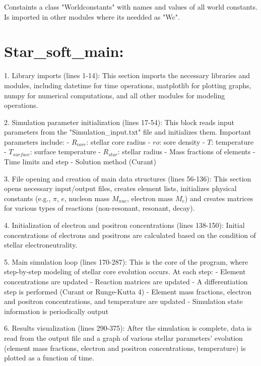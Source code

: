 \documentclass[a4paper,12pt]{article}
\begin{document}
\vspace{1em}

Constaints a class "Worldconstants" with names and values of all world constants. Is imported in other modules where its needded as "Wc".

\section{Star\_soft\_main:}

\vspace{1em}

1. Library imports (lines 1-14):
   This section imports the necessary libraries and modules, including datetime for time operations, matplotlib for plotting graphs, numpy for numerical computations, and all other modules for modeling operations.

2. Simulation parameter initialization (lines 17-54):
   This block reads input parameters from the "Simulation\_input.txt" file and initializes them. Important parameters include:
   - $R_{core}$: stellar core radius
   - $ro$: sore density
   - $T$: temperature
   - $T_{surface}$: surface temperature
   - $R_{star}$: stellar radius
   - Mass fractions of elements
   - Time limits and step
   - Solution method (Curant)

3. File opening and creation of main data structures (lines 56-136):
   This section opens necessary input/output files, creates element lists, initializes physical constants (e.g., $\pi$, $e$, nucleon mass $M_{nuc}$, electron mass $M_e$) and creates matrices for various types of reactions (non-resonant, resonant, decay).

4. Initialization of electron and positron concentrations (lines 138-150):
   Initial concentrations of electrons and positrons are calculated based on the condition of stellar electroneutrality.

5. Main simulation loop (lines 170-287):
   This is the core of the program, where step-by-step modeling of stellar core evolution occurs. At each step:
   - Element concentrations are updated
   - Reaction matrices are updated
   - A differentiation step is performed (Curant or Runge-Kutta 4)
   - Element mass fractions, electron and positron concentrations, and temperature are updated
   - Simulation state information is periodically output

6. Results visualization (lines 290-375):
   After the simulation is complete, data is read from the output file and a graph of various stellar parameters' evolution (element mass fractions, electron and positron concentrations, temperature) is plotted as a function of time.
\end{document}
